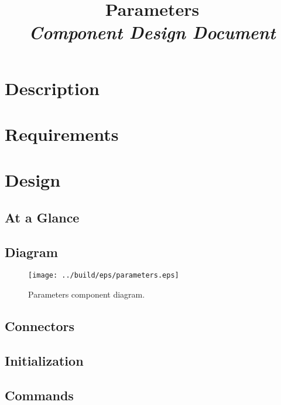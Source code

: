 



\title{\textbf{Parameters} \\
\large\textit{Component Design Document}}
\date{}
\maketitle

\section{Description}


\section{Requirements}


\section{Design}

\subsection{At a Glance}


\subsection{Diagram}
\begin{figure}[H]
  \texttt{[image: ../build/eps/parameters.eps]}
  \caption{Parameters component diagram.}
\end{figure}

\subsection{Connectors}


\subsection{Initialization}


\subsection{Commands}

